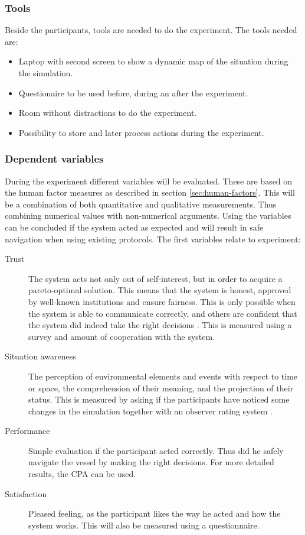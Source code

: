 \subsubsection{Tools}
Beside the participants, tools are needed to do the experiment. The tools needed are:
\begin{itemize}
	\item Laptop with second screen to show a dynamic map of the situation during the simulation.
	\item Questionaire to be used before, during an after the experiment.
	\item Room without distractions to do the experiment.
	\item Possibility to store and later process actions during the experiment.
\end{itemize}

\subsubsection{Dependent variables}
During the experiment different variables will be evaluated. These are based on the human factor measures as described in section \ref{sec:human-factors}. This will be a combination of both quantitative and qualitative measurements. Thus combining numerical values with non-numerical arguments. 
Using the variables can be concluded if the system acted as expected and will result in safe navigation when using existing protocols. The first variables relate to experiment:
\begin{description}
	\item [Trust] The system acts not only out of self-interest, but in order to acquire a pareto-optimal solution. This means that the system is honest, approved by well-known institutions and ensure fairness. This is only possible when the system is able to communicate correctly, and others are confident that the system did indeed take the right decisions \cite{Ozawa2013}.
	This is measured using a survey and amount of cooperation with the system.
	\item [Situation awareness] The perception of environmental elements and events with respect to time or space, the comprehension of their meaning, and the projection of their status. This is measured by asking if the participants have noticed some changes in the simulation together with an observer rating system \cite{Naderpour2016}.
	\item [Performance] Simple evaluation if the participant acted correctly. Thus did he safely navigate the vessel by making the right decisions. For more detailed results, the \acf{CPA} can be used.
	\item [Satisfaction] Pleased feeling, as the participant likes the way he acted and how the system works. This will also be measured using a questionnaire.
\end{description}

